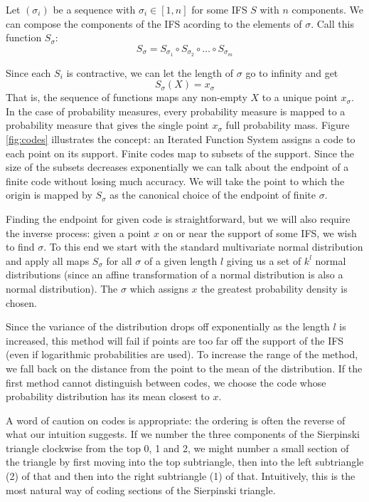 \documentclass[10pt,a4paper,oneside]{article}
\theoremstyle{definition}
\begin{document}
Let $(\sigma_i)$ be a sequence with $\sigma_i \in [1, n]$ for some IFS $S$ with $n$ components. We can compose the components of the IFS acording to the elements of $\sigma$. Call this function $S_\sigma$:
\[
S_\sigma = S_{\sigma_1} \circ S_{\sigma_2} \circ \ldots \circ S_{\sigma_m}
\]

Since each $S_i$ is contractive, we can let the length of $\sigma$ go to infinity and get 
\[
S_\sigma(X) = x_\sigma  
\] 
That is, the sequence of functions maps any non-empty $X$ to a unique point $x_\sigma$. In the case of probability measures, every probability measure is mapped to a probability measure that gives the single point $x_\sigma$ full probability mass. Figure \ref{fig:codes} illustrates the concept: an Iterated Function System assigns a code to each point on its support. Finite codes map to subsets of the support. Since the size of the subsets decreases exponentially we can talk about the endpoint of a finite code without losing much accuracy. We will take the point to which the origin is mapped by $S_\sigma$ as the canonical choice of the endpoint of finite $\sigma$.

Finding the endpoint for given code is straightforward, but we will also require the inverse process: given a point $x$ on or near the support of some IFS, we wish to find $\sigma$. To this end we start with the standard  multivariate normal distribution and apply all maps $S_\sigma$ for all $\sigma$ of a given length $l$ giving us a set of $k^l$ normal distributions (since an affine transformation of a normal distribution is also a normal distribution). The $\sigma$ which assigns $x$ the greatest probability density is chosen.

Since the variance of the distribution drops off exponentially as the length $l$ is increased, this method will fail if points are too far off the support of the IFS (even if logarithmic probabilities are used). To increase the range of the method, we fall back on the distance from the point to the mean of the distribution. If the first method cannot distinguish between codes, we choose the code whose probability distribution has its mean closest to $x$.

A word of caution on codes is appropriate: the ordering is often the reverse of what our intuition suggests. If we number the three components of the Sierpinski triangle clockwise from the top 0, 1 and 2, we might number a small section of the triangle by first moving into the top subtriangle, then into the left subtriangle (2) of that and then into the right subtriangle (1) of that. Intuitively, this is the most natural way of coding sections of the Sierpinski triangle.
\end{document}
